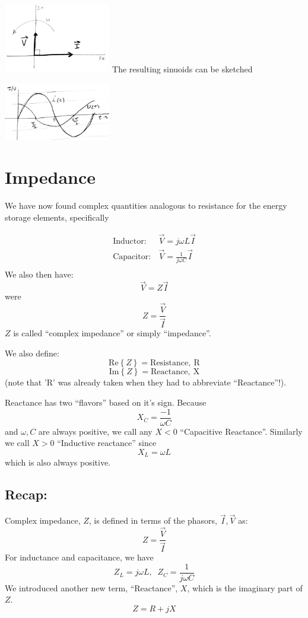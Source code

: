\includegraphics[width=0.35\textwidth]{figsChapt02/EC64016.png}
The resulting sinuoids can be sketched

\includegraphics[width=0.35\textwidth]{figsChapt02/PP03048.png}


\section{Impedance}

We have now found complex quantities analogous to resistance for the energy storage elements, specifically

\begin{align}
\mathrm{Inductor:}  & \vec{V} = j\omega L \vec{I}\\
\mathrm{Capacitor:}  & \vec{V} = \frac{1}{j\omega C} \vec{I}\\
\end{align}
We also then have:
\[
\vec{V} = Z\vec{I}
\]
were
\[
Z = \frac {\vec{V}}  {\vec{I}}
\]
$Z$ is called ``complex impedance'' or simply ``impedance''.

We also define:
\[
\mathrm{Re}\left\{ Z\right\} = \mathrm{Resistance, ~R}
\]
\[
\mathrm{Im}\left\{ Z\right\} = \mathrm{Reactance, ~X}
\]
(note that 'R' was already taken when they had to abbreviate ``Reactance''!).

Reactance has two ``flavors'' based on it's sign.   Because
\[
X_C = \frac {-1}  {\omega C}
\]
and $\omega, C$ are always positive, we call any $X<0$ ``Capacitive Reactance''. Similarly
we call $X>0$ ``Inductive reactance'' since
\[
X_L = \omega L
\]
which is also always positive.


\subsection{Recap:}
Complex impedance, $Z$, is defined in terms of the phasors, $\vec{I}, \vec{V}$ as:
\[
Z = \frac {\vec{V}}  {\vec{I}}
\]
For inductance and capacitance, we have
\[
Z_L = j\omega L,\;\; Z_C = \frac {1}  {j\omega C}
\]
We introduced another new term, ``Reactance'', $X$, which is the imaginary part of $Z$.
\[
Z = R + jX
\]

